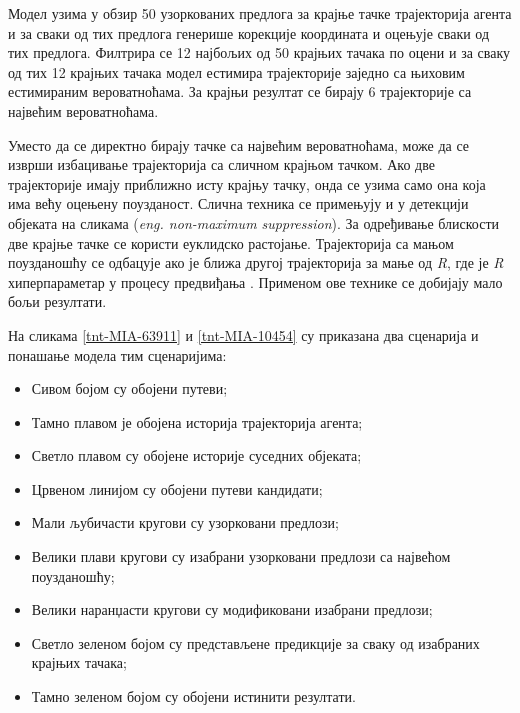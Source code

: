 \documentclass[11pt,oneside]{memoir}
\begin{document}
Модел узима у обзир 50 узоркованих предлога за крајње тачке трајекторија агента и за сваки од тих предлога генерише корекције координата
и оцењује сваки од тих предлога. Филтрира се 12 најбољих од 50 крајњих тачака по оцени и за сваку од тих 12 крајњих тачака
модел естимира трајекторије заједно са њиховим естимираним вероватноћама. За крајњи резултат се бирају 6 трајекторије са највећим 
вероватноћама. 

Уместо да се директно бирају тачке са највећим вероватноћама, може да се изврши избацивање трајекторија са сличном
крајњом тачком. Ако две трајекторије имају приближно исту крајњу тачку, онда се узима само она која има већу оцењену поузданост. Слична
техника се примењују и у детекцији објеката на сликама (\textit{eng. non-maximum suppression}). За одређивање блискости две крајње тачке
се користи еуклидско растојање. Трајекторија са мањом поузданошћу се одбацује ако је ближа другој трајекторија за мање од \textit{R},
где је \textit{R} хиперпараметар у процесу предвиђања \cite{vectornet}. Применом ове технике се добијају мало бољи резултати.

На сликама \ref{tnt-MIA-63911} и \ref{tnt-MIA-10454} су приказана два сценарија и понашање модела тим сценаријима:
\begin{itemize}
  \item Сивом бојом су обојени путеви; 
  \item Тамно плавом је обојена историја трајекторија агента;
  \item Светло плавом су обојене историје суседних објеката;
  \item Црвеном линијом су обојени путеви кандидати;
  \item Мали љубичасти кругови су узорковани предлози;
  \item Велики плави кругови су изабрани узорковани предлози са највећом поузданошћу;
  \item Велики наранџасти кругови су модификовани изабрани предлози; 
  \item Светло зеленом бојом су представљене предикције за сваку од изабраних крајњих тачака;
  \item Тамно зеленом бојом су обојени истинити резултати. 
\end{itemize}
\end{document}
